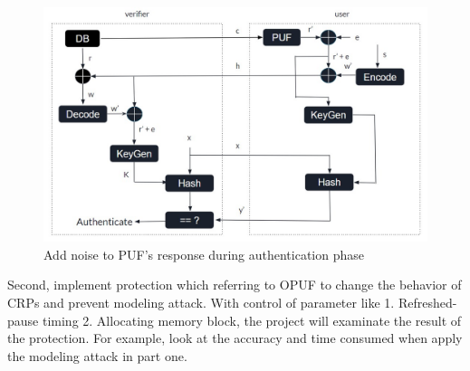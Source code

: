 \begin{figure}[htp]
    \centering
    \includegraphics[width=14cm]{figures/figure10.jpg}
    \caption{Add noise to PUF's response during authentication phase}
    \label{fig:figure10}
    \end{figure}

Second, implement protection which referring to OPUF to change the behavior of CRPs and prevent modeling attack. With control of parameter like 1. Refreshed-pause timing 2. Allocating memory block, 
the project will examinate the result of the protection. For example, look at the accuracy and time consumed when apply the modeling attack in part one.




